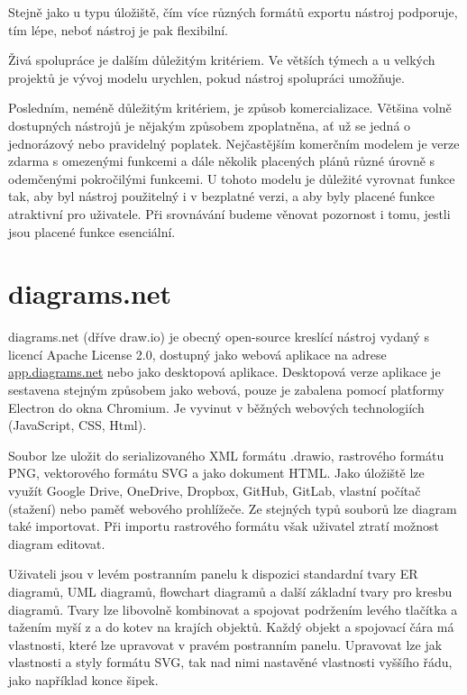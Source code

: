 Stejně jako u typu úložiště, čím více různých formátů exportu nástroj podporuje,
tím lépe, neboť nástroj je pak flexibilní.

Živá spolupráce je dalším důležitým kritériem. Ve větších týmech a u velkých
projektů je vývoj modelu urychlen, pokud nástroj spolupráci umožňuje.

Posledním, neméně důležitým kritériem, je způsob komercializace. Většina volně
dostupných nástrojů je nějakým způsobem zpoplatněna, ať už se jedná o
jednorázový nebo pravidelný poplatek. Nejčastějším komerčním modelem je verze
zdarma s omezenými funkcemi a dále několik placených plánů různé úrovně s
odemčenými pokročilými funkcemi. U tohoto modelu je důležité vyrovnat funkce
tak, aby byl nástroj použitelný i v bezplatné verzi, a aby byly placené funkce
atraktivní pro uživatele. Při srovnávání budeme věnovat pozornost i tomu, jestli
jsou placené funkce esenciální.

\section{diagrams.net}

diagrams.net (dříve draw.io) je obecný open-source kreslící nástroj vydaný s
licencí Apache License 2.0, dostupný jako webová aplikace na adrese
\url{app.diagrams.net} nebo jako desktopová aplikace. Desktopová verze aplikace
je sestavena stejným způsobem jako webová, pouze je zabalena pomocí platformy
Electron do okna Chromium. Je vyvinut v běžných we\-bo\-vých tech\-no\-lo\-gi\-ích (Java\-Script,
CSS, Html).

Soubor lze uložit do serializovaného XML formátu .drawio, rastrového formátu
PNG, vektorového formátu SVG a jako dokument HTML. Jako úložiště lze využít
Google Drive, OneDrive, Dropbox, GitHub, GitLab, vlastní počítač (stažení) nebo
paměť webového prohlížeče. Ze stejných typů souborů lze diagram také importovat.
Při importu rastrového formátu však uživatel ztratí možnost diagram editovat.

Uživateli jsou v levém postranním panelu k dispozici standardní tvary ER
diagramů, UML diagramů, flowchart diagramů a další základní tvary pro kresbu
diagramů. Tvary lze libovolně kombinovat a spojovat podržením levého tlačítka a
tažením myší z a do kotev na krajích objektů. Každý objekt a spojovací čára má
vlastnosti, které lze upravovat v pravém postranním panelu. Upravovat lze jak
vlastnosti a styly formátu SVG, tak nad nimi nastavěné vlastnosti vyššího řádu,
jako například konce šipek.


